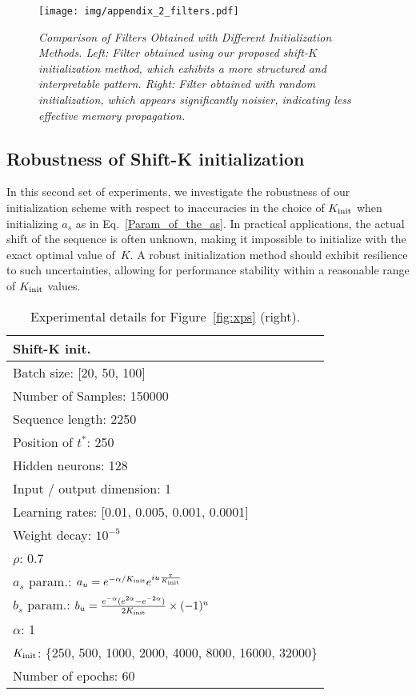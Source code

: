 \begin{figure}
    \centering
    \texttt{[image: img/appendix\_2\_filters.pdf]}

    \vspace*{-.2cm}
    
    \caption{\textit{Comparison of Filters Obtained with Different Initialization Methods. Left: Filter obtained using our proposed shift-$K$ initialization method, which exhibits a more structured and interpretable pattern. Right: Filter obtained with random initialization, which appears significantly noisier, indicating less effective memory propagation. }}
    \label{fig:appendix 2 filters}
\end{figure}

\subsection{Robustness of Shift-K initialization}

In this second set of experiments, we investigate the robustness of our initialization scheme with respect to inaccuracies in the choice of $K_{\textnormal{init}}$ when initializing $a_s$ as in Eq.~\eqref{Param_of_the_as}. In practical applications, the actual shift of the sequence is often unknown, making it impossible to initialize with the exact optimal value of~$K$. A robust initialization method should exhibit resilience to such uncertainties, allowing for performance stability within a reasonable range of $K_{\textnormal{init}}$ values.

\begin{table}[ht]
    \centering
    \begin{tabular}{@{}l@{}}
        \toprule
        \textbf{Shift-K init.} \\ \midrule
        Batch size: [20, 50, 100] \\
        Number of Samples: 150000 \\
        Sequence length: 2250 \\
        Position of $t^*$: 250 \\
        Hidden neurons: 128 \\
        Input / output dimension: 1 \\
        Learning rates: [0.01, 0.005, 0.001, 0.0001] \\
        Weight decay: $10^{-5}$ \\ 
        $\rho$: 0.7 \\ \midrule
        $a_s$ param.: $a_u = e^{-\alpha/K_{\textnormal{init}}}e^{iu\frac{\pi}{K_{\textnormal{init}}}}$\\
        $b_s$ param.: $b_u = \frac{e^{-\alpha}(e^{2\alpha}-e^{-2\alpha})}{2K_{\textnormal{init}}}\times(-1)^u$  \\
        $\alpha$: 1 \\
        $K_{\textnormal{init}}$: \{250, 500, 1000, 2000, 4000, 8000, 16000, 32000\} \\ \midrule
        Number of epochs: 60 \\
        \bottomrule
    \end{tabular}
    \caption{{Experimental details for Figure~\ref{fig:xps} (right).}}
    \label{tab:xp-robustness}
\end{table}
